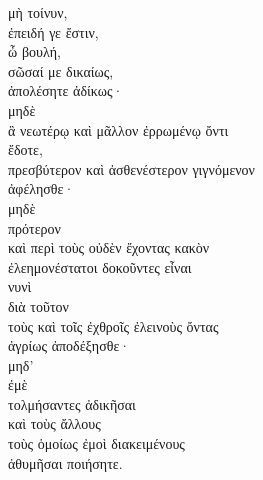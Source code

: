 {\large
\begin{greek}
\noindent μὴ τοίνυν, \\
ἐπειδή γε ἔστιν, \\
ὦ βουλή, \\
\tabto{2em} σῶσαί με δικαίως, \\
ἀπολέσητε ἀδίκως· \\
μηδὲ \\
ἃ νεωτέρῳ καὶ μᾶλλον ἐρρωμένῳ ὄντι \\
\tabto{2em} ἔδοτε, \\
πρεσβύτερον καὶ ἀσθενέστερον γιγνόμενον \\
ἀφέλησθε· \\
μηδὲ \\
\tabto{2em} πρότερον \\
\tabto{2em} καὶ περὶ τοὺς οὐδὲν ἔχοντας κακὸν \\
ἐλεημονέστατοι δοκοῦντες εἶναι \\
\tabto{2em} νυνὶ \\
\tabto{2em} διὰ τοῦτον \\
τοὺς καὶ τοῖς ἐχθροῖς ἐλεινοὺς ὄντας \\
ἀγρίως ἀποδέξησθε· \\
μηδ' \\
ἐμὲ \\
τολμήσαντες ἀδικῆσαι \\
\tabto{2em} καὶ τοὺς ἄλλους \\
\tabto{4em} τοὺς ὁμοίως ἐμοὶ διακειμένους \\
ἀθυμῆσαι ποιήσητε. \\

\end{greek}
}

